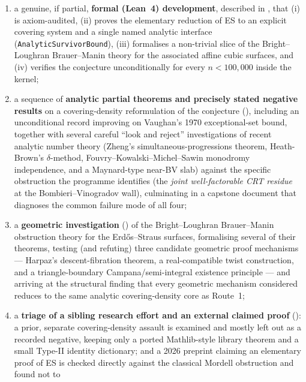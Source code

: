 \documentclass[11pt]{article}
\theoremstyle{plain}
\theoremstyle{definition}
\theoremstyle{remark}
\newcommand{\lean}[1]{\texttt{#1}}
\renewcommand{\_}{\textunderscore\allowbreak}
\begin{document}
\begin{enumerate}[leftmargin=1.6em]
  \item a genuine, if partial, \textbf{formal (Lean~4) development}, described in
        , that (i) is axiom-audited, (ii) proves the elementary reduction of ES to
        an explicit covering system and a single named analytic interface
        (\lean{AnalyticSurvivorBound}), (iii) formalises a non-trivial slice of the
        Bright--Loughran Brauer--Manin theory for the associated affine cubic surfaces, and
        (iv) verifies the conjecture unconditionally for every $n<100{,}000$ inside the kernel;
  \item a sequence of \textbf{analytic partial theorems and precisely stated negative results}
        on a covering-density reformulation of the conjecture (), including an
        unconditional record improving on Vaughan's 1970 exceptional-set bound, together with
        several careful ``look and reject'' investigations of recent analytic number theory
        (Zheng's simultaneous-progressions theorem, Heath-Brown's $\delta$-method,
        Fouvry--Kowalski--Michel--Sawin monodromy independence, and a Maynard-type near-BV slab)
        against the specific obstruction the programme identifies (the \emph{joint
        well-factorable CRT residue} at the Bombieri--Vinogradov wall), culminating in a
        capstone document that diagnoses the common failure mode of all four;
  \item a \textbf{geometric investigation} () of the Bright--Loughran
        Brauer--Manin obstruction theory for the Erd\H{o}s--Straus surfaces, formalising several
        of their theorems, testing (and refuting) three candidate geometric proof mechanisms —
        Harpaz's descent-fibration theorem, a real-compatible twist construction, and a
        triangle-boundary Campana/semi-integral existence principle — and arriving at the
        structural finding that every geometric mechanism considered reduces to the same
        analytic covering-density core as Route~1;
  \item a \textbf{triage of a sibling research effort and an external claimed proof}
        (): a prior, separate covering-density assault is examined and mostly
        left out as a recorded negative, keeping only a ported Mathlib-style library theorem and
        a small Type-II identity dictionary; and a 2026 preprint claiming an elementary proof of
        ES is checked directly against the classical Mordell obstruction and found not to

\end{enumerate}
\end{document}
